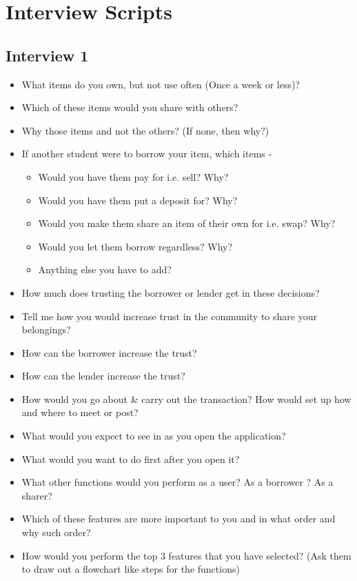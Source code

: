 \chapter{Interview Scripts}
\label{appendix:interview}
\section{Interview 1}
\label{sec:interview1}
\begin{itemize}
	\item What items do you own, but not use often (Once a week or less)?
	\item Which of these items would you share with others?
	\item Why those items and not the others? (If none, then why?)
	\item If another student were to borrow your item, which items - 
		\begin{itemize}
			\item Would you have them pay for i.e. sell? Why?
			\item Would you have them put a deposit for? Why?
			\item Would you make them share an item of their own for i.e. swap? Why?
			\item Would you let them borrow regardless? Why?
			\item Anything else you have to add?
		\end{itemize}
	\item How much does trusting the borrower or lender get in these decisions?
	\item Tell me how you would increase trust in the community to share your belongings?
	\item How can the borrower increase the trust?
	\item How can the lender increase the trust?
	\item How would you go about \& carry out the transaction? How would set up how and where to meet or post?
	\item What would you expect to see in as you open the application? 
	\item What would you want to do first after you open it? 
	\item What other functions would you perform as a user? As a borrower ? As a sharer? 
	\item Which of these features are more important to you and in what order and why such order? 
	\item How would you perform the top 3 features that you have selected? (Ask them to draw out a flowchart like steps for the functions) 
\end{itemize}

